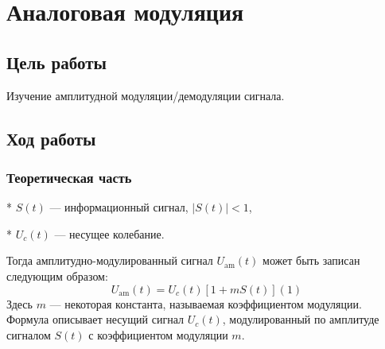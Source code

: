 \chapter{Аналоговая модуляция}

\section{Цель работы}
Изучение амплитудной модуляции/демодуляции сигнала.

\section{Ход работы}

\subsection{Теоретическая часть}
* $S(t)$ — информационный сигнал, $|S(t)|<1$,

* $U_c(t)$ — несущее колебание.

Тогда амплитудно-модулированный сигнал $U_\text{am}(t)$ может быть записан следующим образом:
$$U_\text{am}(t)=U_c(t)[1+mS(t)] (1)$$
Здесь $m$ — некоторая константа, называемая коэффициентом модуляции. Формула описывает несущий сигнал $U_c(t)$, модулированный по амплитуде сигналом $S(t)$ с коэффициентом модуляции $m$.

